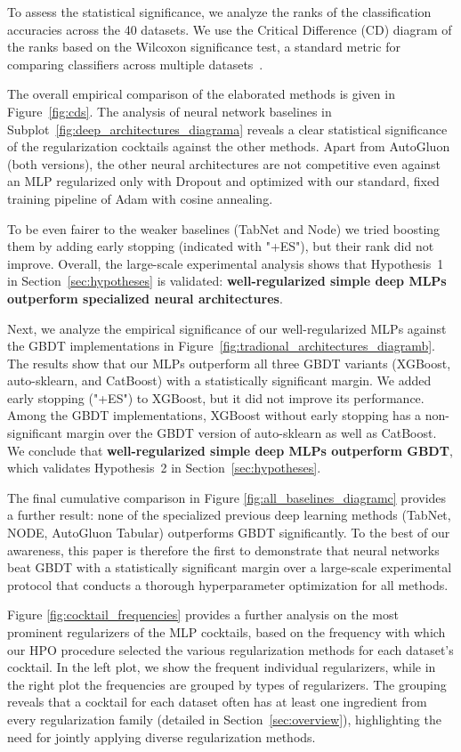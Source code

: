 To assess the statistical significance, we analyze the ranks of the classification accuracies across the 40 datasets. We use the Critical Difference (CD) diagram of the ranks based on the Wilcoxon significance test, a standard metric for comparing classifiers across multiple datasets~\citep{10.5555/1248547.1248548}.

The overall empirical comparison of the elaborated methods is given in Figure~\ref{fig:cds}. The analysis of neural network baselines in Subplot~\ref{fig:deep_architectures_diagrama}  reveals a clear statistical significance of the regularization cocktails against the other methods. Apart from AutoGluon (both versions), the other neural architectures are not competitive even against an MLP regularized only with Dropout and optimized with our standard, fixed training pipeline of Adam with cosine annealing. 

To be even fairer to the weaker baselines (TabNet and Node) we tried boosting them by adding early stopping (indicated with "+ES"), but their rank did not improve. Overall, the large-scale experimental analysis shows that Hypothesis~1 in Section~\ref{sec:hypotheses} is validated: \textbf{well-regularized simple deep MLPs outperform specialized neural architectures}. 

Next, we analyze the empirical significance of our well-regularized MLPs against the GBDT implementations in Figure~\ref{fig:tradional_architectures_diagramb}. The results show that our MLPs outperform all three GBDT variants (XGBoost, auto-sklearn, and CatBoost) with a statistically significant margin. We added early stopping ("+ES") to XGBoost, but it did not improve its performance. Among the GBDT implementations, XGBoost without early stopping has a non-significant margin over the GBDT version of auto-sklearn as well as CatBoost. We conclude that \textbf{well-regularized simple deep MLPs outperform GBDT}, which validates Hypothesis~2 in Section~\ref{sec:hypotheses}. 

The final cumulative comparison in Figure \ref{fig:all_baselines_diagramc} provides a further result: none of the specialized previous deep learning methods (TabNet, NODE, AutoGluon Tabular) outperforms GBDT significantly. To the best of our awareness, this paper is therefore the first to demonstrate that neural networks beat GBDT with a statistically significant margin over a large-scale experimental protocol that conducts a thorough hyperparameter optimization for all methods.

Figure \ref{fig:cocktail_frequencies} provides a further analysis on the most prominent regularizers of the MLP cocktails, based on the frequency with which our HPO procedure selected the various regularization methods for each dataset's cocktail. In the left plot, we show the frequent individual regularizers, while in the right plot the frequencies are grouped by types of regularizers. The grouping reveals that a cocktail for each dataset often has at least one ingredient from every regularization family (detailed in Section~\ref{sec:overview}), highlighting the need for jointly applying diverse regularization methods.

